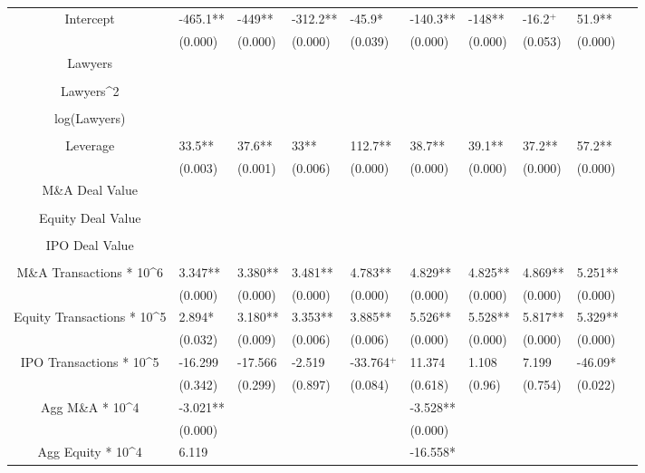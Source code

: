 \documentclass{article}
\begin{document}
\begin{table}[H]
\begin{tabular}{|clllllllll|}
Intercept & -465.1** & -449** & -312.2** & -45.9* & -140.3** & -148** & -16.2$^{+}$ & 51.9** & \\ 
   & (0.000) & (0.000) & (0.000) & (0.039) & (0.000) & (0.000) & (0.053) & (0.000) & \\ 
  Lawyers &  &  &  &  &  &  &  &  & \\ 
   &  &  &  &  &  &  &  &  & \\ 
  Lawyers^2 &  &  &  &  &  &  &  &  & \\ 
   &  &  &  &  &  &  &  &  & \\ 
  log(Lawyers) &  &  &  &  &  &  &  &  & \\ 
   &  &  &  &  &  &  &  &  & \\ 
  Leverage & 33.5** & 37.6** & 33** & 112.7** & 38.7** & 39.1** & 37.2** & 57.2** & \\ 
   & (0.003) & (0.001) & (0.006) & (0.000) & (0.000) & (0.000) & (0.000) & (0.000) & \\ 
  M\&A Deal Value &  &  &  &  &  &  &  &  & \\ 
   &  &  &  &  &  &  &  &  & \\ 
  Equity Deal Value &  &  &  &  &  &  &  &  & \\ 
   &  &  &  &  &  &  &  &  & \\ 
  IPO Deal Value &  &  &  &  &  &  &  &  & \\ 
   &  &  &  &  &  &  &  &  & \\ 
  M\&A Transactions * 10^6 & 3.347** & 3.380** & 3.481** & 4.783** & 4.829** & 4.825** & 4.869** & 5.251** & \\ 
   & (0.000) & (0.000) & (0.000) & (0.000) & (0.000) & (0.000) & (0.000) & (0.000) & \\ 
  Equity Transactions * 10^5 & 2.894* & 3.180** & 3.353** & 3.885** & 5.526** & 5.528** & 5.817** & 5.329** & \\ 
   & (0.032) & (0.009) & (0.006) & (0.006) & (0.000) & (0.000) & (0.000) & (0.000) & \\ 
  IPO Transactions * 10^5 & -16.299 & -17.566 & -2.519 & -33.764$^{+}$ & 11.374 & 1.108 & 7.199 & -46.09* & \\ 
   & (0.342) & (0.299) & (0.897) & (0.084) & (0.618) & (0.96) & (0.754) & (0.022) & \\ 
  Agg M\&A * 10^4 & -3.021** &  &  &  & -3.528** &  &  &  & \\ 
   & (0.000) &  &  &  & (0.000) &  &  &  & \\ 
  Agg Equity * 10^4 & 6.119 &  &  &  & -16.558* &  &  &  & \\ 

\end{tabular}
\end{table}
\end{document}
